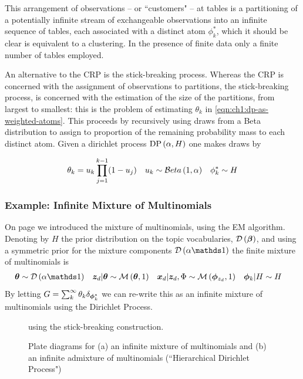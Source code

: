 This arrangement of observations -- or ``customers" --  at tables is a partitioning of a potentially infinite stream of exchangeable observations into an infinite sequence of tables, each associated with a distinct atom $\phi^*_k$, which it should be clear is equivalent to a clustering. In the presence of finite data only a finite number of tables employed.


An alternative to the CRP is the stick-breaking process. Whereas the CRP is concerned with the assignment of observations to partitions, the stick-breaking process, is concerned with the estimation of the size of the partitions, from largest to smallest: this is the problem of estimating $\theta_k$ in \eqref{eqn:ch1:dp-as-weighted-atoms}. This proceeds by recursively using draws from a Beta distribution to assign to proportion of the remaining probability mass to each distinct atom. Given a dirichlet process $\text{DP} \left( {\alpha, H} \right)$ one makes draws by

\begin{align}
\theta_k & = u_k \prod_{j=1}^{k-1} (1 - u_j) &
u_k & \sim \mathcal{B}eta \left( {1}, {\alpha} \right) &
\phi^*_k \sim H
\end{align}


\subsubsection*{Example: Infinite Mixture of Multinomials}
On page \pageref{sec:ch1:mom} we introduced the mixture of multinomials, using the EM algorithm. Denoting by $H$ the prior distribution on the topic vocabularies, $\mathcal{D} \left( {\bm \beta} \right)$, and using a symmetric prior for the mixture components $\dir{\alpha \one}$ the finite mixture of multinomials is
\begin{align}
\vv{\theta} & \sim \dir{\alpha \one} &
\zd|\vv{\theta} & \sim \muln{\vv{\theta}}{1} & 
\xd|\zd, \params & \sim \muln{\param_{z_{d}}}{1} & 
\param_k|H & \sim H
\end{align}
By letting $G = \sum_k^\infty \theta_k \delta_{\bm \phi^*_k}$ we can re-write this as an infinite mixture of multinomials using the Dirichlet Process.

\begin{figure}
\centering
    \subfigure[]{
        \resizebox{0.3\textwidth}{0.40\textwidth}{
            
        }
    }
    \subfigure[]{
        \resizebox{0.5\textwidth}{0.40\textwidth}{
            
        }
    }

    \caption{Plate diagrams for (a) an infinite mixture of multinomials and (b) an infinite admixture of multinomials (``Hierarchical Dirichlet Process")} using the stick-breaking construction.
\label{fig:inf-plates}
\end{figure}

